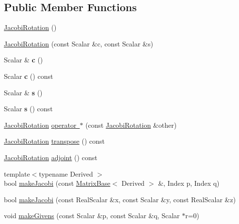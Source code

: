 \subsection*{Public Member Functions}
\begin{DoxyCompactItemize}
\item 
\mbox{\hyperlink{class_eigen_1_1_jacobi_rotation_a38fec2c4da529ef3d05ff37b848b4227}{Jacobi\+Rotation}} ()
\item 
\mbox{\hyperlink{class_eigen_1_1_jacobi_rotation_a3e8b5dc0a56f7a2d0f788b1ccb1547cb}{Jacobi\+Rotation}} (const Scalar \&c, const Scalar \&s)
\item 
\mbox{\label{class_eigen_1_1_jacobi_rotation_af1c132146bc93a872b799bc57d9ced50}} 
Scalar \& {\bfseries c} ()
\item 
\mbox{\label{class_eigen_1_1_jacobi_rotation_a1cc768e0ad5492a5656791cb45194184}} 
Scalar {\bfseries c} () const
\item 
\mbox{\label{class_eigen_1_1_jacobi_rotation_a2c7a08e2d27875fd770d489317746969}} 
Scalar \& {\bfseries s} ()
\item 
\mbox{\label{class_eigen_1_1_jacobi_rotation_ae6f58fffecb41adb8d037c385b856628}} 
Scalar {\bfseries s} () const
\item 
\mbox{\hyperlink{class_eigen_1_1_jacobi_rotation}{Jacobi\+Rotation}} \mbox{\hyperlink{class_eigen_1_1_jacobi_rotation_a3a9d07201435273f6e001592fc547dcb}{operator $\ast$}} (const \mbox{\hyperlink{class_eigen_1_1_jacobi_rotation}{Jacobi\+Rotation}} \&other)
\item 
\mbox{\hyperlink{class_eigen_1_1_jacobi_rotation}{Jacobi\+Rotation}} \mbox{\hyperlink{class_eigen_1_1_jacobi_rotation_ab40e9cdc4582593511e57ee896e055a2}{transpose}} () const
\item 
\mbox{\hyperlink{class_eigen_1_1_jacobi_rotation}{Jacobi\+Rotation}} \mbox{\hyperlink{class_eigen_1_1_jacobi_rotation_a89c8ea615f8fa77ddd5810a1e5fde4da}{adjoint}} () const
\item 
{\footnotesize template$<$typename Derived $>$ }\\bool \mbox{\hyperlink{class_eigen_1_1_jacobi_rotation_a69076401f22e883dc76b6ff9074ac669}{make\+Jacobi}} (const \mbox{\hyperlink{class_eigen_1_1_matrix_base}{Matrix\+Base}}$<$ Derived $>$ \&, Index p, Index q)
\item 
bool \mbox{\hyperlink{class_eigen_1_1_jacobi_rotation_a6572f272cac38e070a99b466dd1fbc74}{make\+Jacobi}} (const Real\+Scalar \&x, const Scalar \&y, const Real\+Scalar \&z)
\item 
void \mbox{\hyperlink{class_eigen_1_1_jacobi_rotation_adb5bcb0d28a95e39ca31c2c17e866092}{make\+Givens}} (const Scalar \&p, const Scalar \&q, Scalar $\ast$r=0)
\end{DoxyCompactItemize}

